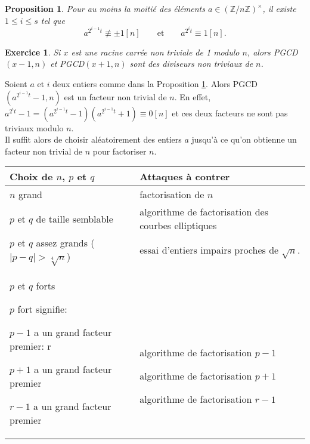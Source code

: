 \documentclass[12pt]{report}
\newtheorem*{exo}{Exercice}
\newtheorem{Prop}[thm]{Proposition}
\begin{document}
\begin{Prop}\label{p31}
Pour au moins la moitié des éléments $a \in (\mathbb{Z}/n\mathbb{Z})^{\times}$, il existe $1 \leq i \leq s  $ tel que
$$   a^{2^{i-1}t}\not \equiv \pm 1 [n] \qquad \text{et} \qquad a^{2^i t}\equiv 1 [n] .       $$
\end{Prop}

\begin{exo}
Si $x$ est une racine carrée non triviale de 1 modulo $n$, alors PGCD$(x-1,n)$ et PGCD$(x+1,n)$ sont des diviseurs non triviaux de $n$.
\end{exo}


Soient $a$ et $i$ deux entiers comme dans la Proposition \ref{p31}. Alors PGCD$(a^{2^{i-1}t}-1,n)$ est un facteur non trivial de $n$. En effet, $ a^{2^i t}-1 =(a^{2^{i-1}t}-1)(a^{2^{i-1}t}+1) \equiv 0 [n]  $ et ces deux facteurs ne sont pas triviaux modulo $n$.\\
Il suffit alors de choisir aléatoirement des entiers $a$ jusqu'à ce qu'on obtienne un facteur non trivial de $n$ pour factoriser $n$.

\bigskip

\begin{tabular}{p{6cm}|p{6cm}}
{Choix de $n$, $p$ et $q$}  & Attaques à contrer \\
\hline 
$n$ grand & factorisation de $n$ \\
\hline
$p$ et $q$ de taille semblable  & algorithme de factorisation des courbes elliptiques \\
\hline
$p$ et $q$ assez grands ($|p-q|> \sqrt[4]{n} $) & essai d'entiers impairs proches de $\sqrt{n}$. \\
\hline
$p$ et $q$ forts

$p$ fort signifie:

$p-1$ a un grand facteur premier: r

$p+1$ a un grand facteur premier

$r-1$ a un grand facteur premier

 & \
 
 \
 
 algorithme de factorisation $p-1$
 
 algorithme de factorisation $p+1$
 
  algorithme de factorisation $r-1$ 
 
 
 \\

\end{tabular}
\end{document}
